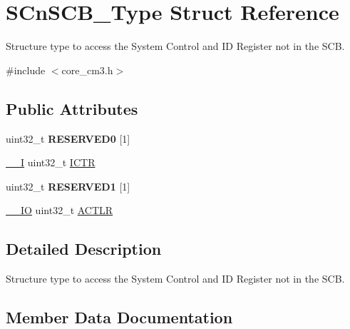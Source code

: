 \hypertarget{struct_s_cn_s_c_b___type}{}\section{S\+Cn\+S\+C\+B\+\_\+\+Type Struct Reference}
\label{struct_s_cn_s_c_b___type}


Structure type to access the System Control and ID Register not in the S\+CB.  




{\ttfamily \#include $<$core\+\_\+cm3.\+h$>$}

\subsection*{Public Attributes}
\begin{DoxyCompactItemize}
\item 
uint32\+\_\+t {\bfseries R\+E\+S\+E\+R\+V\+E\+D0} \mbox{[}1\mbox{]}\hypertarget{struct_s_cn_s_c_b___type_a9c1cf408b90b40c62f396da41416290f}{}\label{struct_s_cn_s_c_b___type_a9c1cf408b90b40c62f396da41416290f}

\item 
\hyperlink{core__sc300_8h_af63697ed9952cc71e1225efe205f6cd3}{\+\_\+\+\_\+I} uint32\+\_\+t \hyperlink{struct_s_cn_s_c_b___type_ad99a25f5d4c163d9005ca607c24f6a98}{I\+C\+TR}
\item 
uint32\+\_\+t {\bfseries R\+E\+S\+E\+R\+V\+E\+D1} \mbox{[}1\mbox{]}\hypertarget{struct_s_cn_s_c_b___type_aa4e25c7691de11dd20a02d4732111496}{}\label{struct_s_cn_s_c_b___type_aa4e25c7691de11dd20a02d4732111496}

\item 
\hyperlink{core__sc300_8h_aec43007d9998a0a0e01faede4133d6be}{\+\_\+\+\_\+\+IO} uint32\+\_\+t \hyperlink{struct_s_cn_s_c_b___type_aacadedade30422fed705e8dfc8e6cd8d}{A\+C\+T\+LR}
\end{DoxyCompactItemize}


\subsection{Detailed Description}
Structure type to access the System Control and ID Register not in the S\+CB. 

\subsection{Member Data Documentation}
